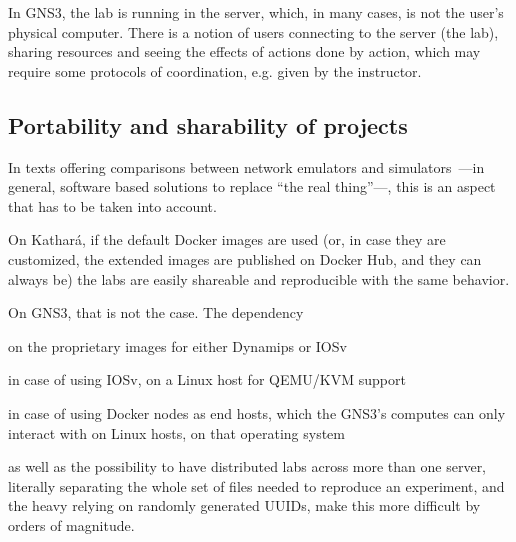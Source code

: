 In GNS3, the lab is running in the server, which, in many cases, is not the user's physical computer.
There is a notion of users connecting to the server (the lab), sharing resources and seeing the effects of actions done by action, which may require some protocols of coordination, e.g. given by the instructor.

\subsection{Portability and sharability of projects}
\label{subsec:comparativeportability}
In texts offering comparisons between network emulators and simulators~\cite{netkit-full,reproduciblenetexp}---in general, software based solutions to replace ``the real thing''---, this is an aspect that has to be taken into account.

On Kathará, if the default Docker images are used (or, in case they are customized, the extended images are published on Docker Hub, and they can always be) the labs are easily shareable and reproducible with the same behavior.

On GNS3, that is not the case.
The dependency
  \begin{enumerate*}[label=(\roman*), itemjoin={{, }}, itemjoin*={{, and }}]
  \item on the proprietary images for either Dynamips or IOSv
  \item in case of using IOSv, on a Linux host for QEMU/KVM support
  \item in case of using Docker nodes as end hosts, which the GNS3's computes can only interact with on Linux hosts, on that operating system
  \end{enumerate*}
as well as the possibility to have distributed labs across more than one server, literally separating the whole set of files needed to reproduce an experiment, and the heavy relying on randomly generated UUIDs, make this more difficult by orders of magnitude. %

